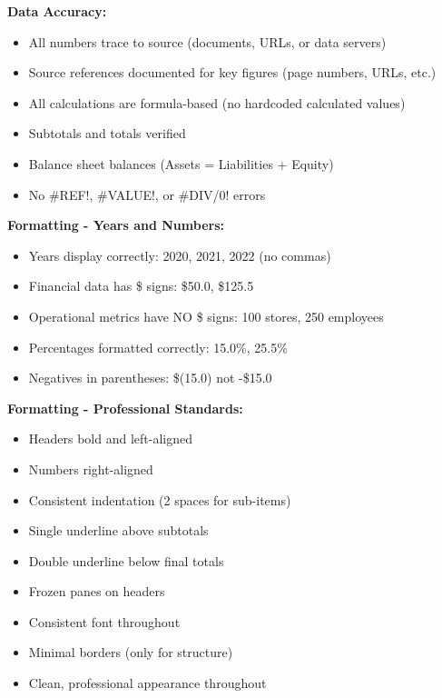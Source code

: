 \documentclass[11pt]{article}
\begin{document}
\textbf{Data Accuracy:}

\begin{itemize}[leftmargin=*,itemsep=2pt,topsep=2pt]
\item {} All numbers trace to source (documents, URLs, or data servers)
\item {} Source references documented for key figures (page numbers, URLs, etc.)
\item {} All calculations are formula-based (no hardcoded calculated values)
\item {} Subtotals and totals verified
\item {} Balance sheet balances (Assets = Liabilities + Equity)
\item {} No \#REF!, \#VALUE!, or \#DIV/0! errors
\end{itemize}

\textbf{Formatting - Years and Numbers:}

\begin{itemize}[leftmargin=*,itemsep=2pt,topsep=2pt]
\item {} Years display correctly: 2020, 2021, 2022 (no commas)
\item {} Financial data has \$ signs: \$50.0, \$125.5
\item {} Operational metrics have NO \$ signs: 100 stores, 250 employees
\item {} Percentages formatted correctly: 15.0\%, 25.5\%
\item {} Negatives in parentheses: \$(15.0) not -\$15.0
\end{itemize}

\textbf{Formatting - Professional Standards:}

\begin{itemize}[leftmargin=*,itemsep=2pt,topsep=2pt]
\item {} Headers bold and left-aligned
\item {} Numbers right-aligned
\item {} Consistent indentation (2 spaces for sub-items)
\item {} Single underline above subtotals
\item {} Double underline below final totals
\item {} Frozen panes on headers
\item {} Consistent font throughout
\item {} Minimal borders (only for structure)
\item {} Clean, professional appearance throughout
\end{itemize}
\end{document}
